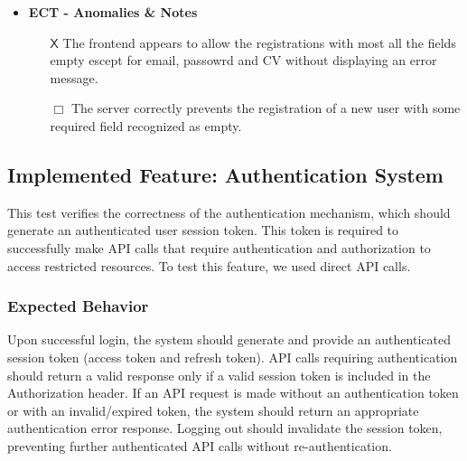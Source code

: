 \begin{itemize} [label= {\color{titleColor}\(\diamond\)}]
\begin{itemize}
        Checking the database no new user were created. For further testing we execute the call to the API endpoint \verb|/api/v1/auth/email/register| that providing only email, password, cv and user type in the body. The response was:
        \begin{verbatim}
        "status": 422,
        "errors": {
                "fullName": "fullName should not be empty"
                }
        \end{verbatim}
        \item \textbf{\color{titleColor} ECT - Anomalies \& Notes}
        \begin{itemize}
            \item [{\color{titleColor}\(\mathsf{X}\)}] The frontend appears to allow the registrations with most all the fields empty escept for email, passowrd and CV without displaying an error message.
            \item [{\color{titleColor}\(\Box \)}] The server correctly prevents the registration of a new user with some required field recognized as empty.
        \end{itemize} 
    \end{itemize}
\end{itemize}


\subsection{Implemented Feature: Authentication System}
This test verifies the correctness of the authentication mechanism, which should generate an authenticated user session token. This token is required to successfully make API calls that require authentication and authorization to access restricted resources. To test this feature, we used direct API calls.
\subsubsection{Expected Behavior}
Upon successful login, the system should generate and provide an authenticated session token (access token and refresh token). 
API calls requiring authentication should return a valid response only if a valid session token is included in the Authorization header. 
If an API request is made without an authentication token or with an invalid/expired token, the system should return an appropriate authentication error response. 
Logging out should invalidate the session token, preventing further authenticated API calls without re-authentication.
